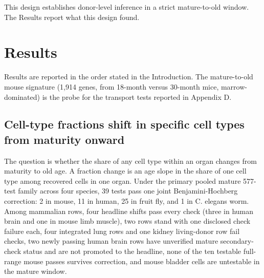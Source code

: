 \documentclass[11pt]{article}
\begin{document}
This design establishes donor-level inference in a strict mature-to-old window. The Results report what this design found.
\section*{Results}

Results are reported in the order stated in the Introduction. The mature-to-old mouse signature (1,914 genes, from 18-month versus 30-month mice, marrow-dominated) is the probe for the transport tests reported in Appendix D.

\subsection*{Cell-type fractions shift in specific cell types from maturity onward}

The question is whether the share of any cell type within an organ changes from maturity to old age. A fraction change is an age slope in the share of one cell type among recovered cells in one organ. Under the primary pooled mature 577-test family across four species, 39 tests pass one joint Benjamini-Hochberg correction: 2 in mouse, 11 in human, 25 in fruit fly, and 1 in C. elegans worm. Among mammalian rows, four headline shifts pass every check (three in human brain and one in mouse limb muscle), two rows stand with one disclosed check failure each, four integrated lung rows and one kidney living-donor row fail checks, two newly passing human brain rows have unverified mature secondary-check status and are not promoted to the headline, none of the ten testable full-range mouse passes survives correction, and mouse bladder cells are untestable in the mature window.
\end{document}
